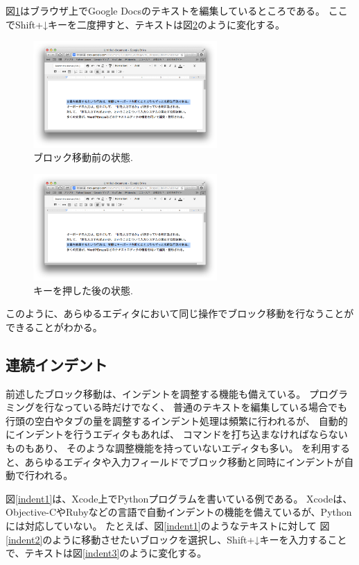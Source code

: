 図\ref{move3}はブラウザ上でGoogle Docsのテキストを編集しているところである。
ここでShift+↓キーを二度押すと、テキストは図\ref{move4}のように変化する。

\begin{figure}[H]
\centerline{\includegraphics[width=70mm,bb=0 0 935 542]{figures/block4.png}}
\caption{ブロック移動前の状態.}
\label{move3}
\end{figure}

\begin{figure}[H]
\centerline{\includegraphics[width=70mm,bb=0 0 935 542]{figures/block5.png}}
\caption{キーを押した後の状態.}
\label{move4}
\end{figure}

このように、あらゆるエディタにおいて同じ操作でブロック移動を行なうことができることがわかる。

\subsection{連続インデント}

前述したブロック移動は、インデントを調整する機能も備えている。
プログラミングを行なっている時だけでなく、
普通のテキストを編集している場合でも
行頭の空白やタブの量を調整するインデント処理は頻繁に行われるが、
自動的にインデントを行うエディタもあれば、
コマンドを打ち込まなければならないものもあり、
そのような調整機能を持っていないエディタも多い。
{\system}を利用すると、あらゆるエディタや入力フィールドでブロック移動と同時にインデントが自動で行われる。

図\ref{indent1}は、Xcode上でPythonプログラムを書いている例である。
Xcodeは、Objective-CやRubyなどの言語で自動インデントの機能を備えているが、Pythonには対応していない。
たとえば、図\ref{indent1}のようなテキストに対して
図\ref{indent2}のように移動させたいブロックを選択し、Shift+↓キーを入力することで、テキストは図\ref{indent3}のように変化する。

